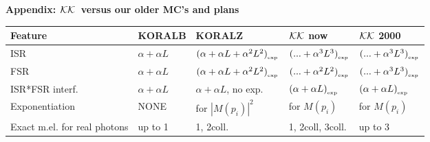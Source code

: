 \documentclass[dvips,portrait]{cernsem}             %
\newcommand{\KK}{${\cal KK}$}
\begin{document}
\begin{Slide}{{\bf\color{red} Appendix: \KK\ versus our older MC's and plans}}


\vspace{-2mm}
{\scriptsize
\begin{center}
\begin{tabular}{|p{17mm}|l|l|l|l|}
\hline\hline
Feature & KORALB &KORALZ & ${\cal KK}$ now & ${\cal KK}$ 2000\\ 
\hline\hline%
%
ISR  & $\alpha+\alpha L$ & {\tiny $(\alpha+\alpha L+\alpha^2 L^2)_{_{\rm exp}}$} 
                         & {\tiny\color{red} $(...+\alpha^3 L^3)_{_{\rm exp}}$}             
                         & {\tiny $(...+\alpha^3 L^3)_{_{\rm exp}}$} \\
\hline%
FSR  & $\alpha+\alpha L$ & {\tiny $(\alpha+\alpha L+\alpha^2 L^2)_{_{\rm exp}}$} 
                         & {\tiny $(...+\alpha^2 L^2)_{_{\rm exp}}$}             
                         & {\tiny $(...+\alpha^3 L^3)_{_{\rm exp}}$} \\
\hline%
{\tiny ISR*FSR interf.}  & {\tiny $\alpha+\alpha L$} 
                      & {\tiny $\alpha+\alpha L$, no exp.} 
                      & {\tiny\color{red} $(\alpha+\alpha L)_{_{\rm exp}}$}
                      & {\tiny            $(\alpha+\alpha L)_{_{\rm exp}}$}\\
\hline%
{\tiny Exponentiation}   &  NONE  & for $|M(p_i)|^2$   
                                  & {\color{red}for $M(p_i)$}   
                                  & {\color{red}for $M(p_i)$}   \\
\hline%
{\tiny Exact m.el. for real photons} 
                       & up to 1  & 1, 2coll.   & 1, 2coll, 3coll.   & {\color{red}up to 3 } \\

\end{tabular}
\end{center}}
\end{Slide}
\end{document}
